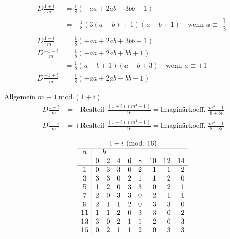 \[
\begin{aligned}
D\frac{1+i}m&=\tfrac18(-aa+2ab-3bb+1)\\
&=-\tfrac18(3(a-b)\mp1)(a-b\mp1)\quad\text{wenn }a\equiv\substack{1\\3}\\
D\frac{1-i}m&=\tfrac18(+aa+2ab+3bb-1)\\
D\frac{-1-i}m&=\tfrac18(-aa+2ab+bb+1)\\
&=\tfrac18(a-b\mp1)(a-b\mp3)\quad\text{wenn }a\equiv\pm1\\
D\frac{-1+i}m&=\tfrac18(+aa+2ab-bb-1)
\end{aligned}
\]


Allgemein $m\equiv1\ \mathrm{mod.}(1+i)$
\[
\begin{aligned}
D\frac{1+i}m&=-\text{Realteil }\frac{(1+i)(m^4-1)}{16}=\text{Imaginärkoeff. }\frac{m^4-1}{8+8i}\\
D\frac{1-i}m&=+\text{Realteil }\frac{(1-i)(m^4-1)}{16}=\text{Imaginärkoeff. }\frac{m^4-1}{8-8i}
\end{aligned}
\]

\[
\begin{array}{c|rrrrrrrr}
\multicolumn{9}{c}{1+i\ (\mathrm{mod.}\ 16)}\\\hline
a&\multicolumn{8}{l}{\quad b}\\
&0&2&4&6&8&10&12&14\\\hline
1&0&3&3&0&2&1&1&2\\
3&3&3&0&2&1&1&2&0\\
5&1&2&0&3&3&0&2&1\\
7&2&0&3&3&0&2&1&1\\
9&2&1&1&2&0&3&3&0\\
11&1&1&2&0&3&3&0&2\\
13&3&0&2&1&1&2&0&3\\
15&0&2&1&1&2&0&3&3
\end{array}
\]
